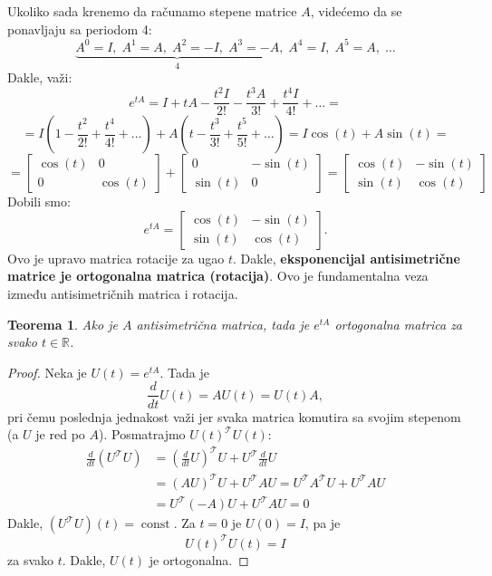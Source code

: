 \documentclass[a4paper,12pt,twoside]{report}
\newtheorem{theorem}{Teorema}[section]
\numberwithin{algorithm}{section}
\begin{document}
    Ukoliko sada krenemo da računamo stepene matrice $A$, videćemo da se ponavljaju sa periodom 4:
    \[ \underbrace{A^0 = I, \; A^1 = A, \; A^2 = -I, \; A^3 = -A}_4, \; A^4 = I,\; A^5 = A,\; \dots \]
    Dakle, važi:
    \[ e^{tA} = I + tA - \frac{t^2I}{2!} - \frac{t^3A}{3!} + \frac{t^4I}{4!} + \dots =\] \[= I \left(1 - \frac{t^2}{2!} + \frac{t^4}{4!} + 
    \dots \right) + A\left(t - \frac{t^3}{3!} + \frac{t^5}{5!} + \dots\right) = I \cos (t) + A \sin(t) = \]
    \[ = \begin{bmatrix}
        \cos(t) & 0 \\
        0 & \cos(t)
    \end{bmatrix} + \begin{bmatrix}
        0 & -\sin(t)\\
        \sin(t) & 0
    \end{bmatrix} = \begin{bmatrix}
        \cos (t) & -\sin (t)\\
        \sin(t) & \cos(t)
    \end{bmatrix}\]
    Dobili smo:
    \[ e^{tA} = \begin{bmatrix}
        \cos (t) & -\sin (t)\\
        \sin(t) & \cos(t)
    \end{bmatrix}. \]
    Ovo je upravo matrica rotacije za ugao $t$. Dakle, \textbf{eksponencijal antisimetrične matrice je ortogonalna matrica (rotacija)}. Ovo je fundamentalna veza između antisimetričnih matrica i rotacija.

    \begin{theorem}
        Ako je $A$ antisimetrična matrica, tada je $e^{tA}$ ortogonalna matrica za svako $t \in \mathbb{R}$.
    \end{theorem}
    \begin{proof}
        Neka je $U(t) = e^{tA}$. Tada je
        \[ \frac{d}{dt}U(t) = AU(t) = U(t)A, \]
        pri čemu poslednja jednakost važi jer svaka matrica komutira sa svojim stepenom (a $U$ je red po $A$). Posmatrajmo
        $U(t)^\mathcal{T}U(t)$:
        \[\begin{aligned}
            \frac{d}{dt}(U^\mathcal{T}U) &= \left(\frac{d}{dt}U\right)^\mathcal{T}U + U^\mathcal{T} \frac{d}{dt}U \\[6pt]
             &= (AU)^\mathcal{T}U + U^\mathcal{T}AU 
            = U^\mathcal{T}A^\mathcal{T}U + U^\mathcal{T}AU \\[6pt] &= U^\mathcal{T}(-A)U + 
            U^\mathcal{T}AU = 0
        \end{aligned}\]
        Dakle, $(U^\mathcal{T}U)(t) = \operatorname{const}$. Za $t = 0$ je $U(0) = I$, pa je 
        \[ U(t)^\mathcal{T}U(t) = I \]
        za svako $t$. Dakle, $U(t)$ je ortogonalna.
    \end{proof}
\end{document}
